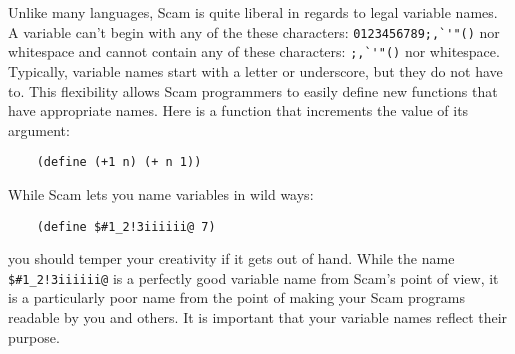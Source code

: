 Unlike many languages,
Scam is quite liberal in regards to legal variable names.
A variable can't begin with any of the these characters:
\verb!0123456789;,`'"()! nor whitespace and cannot contain any of these
characters: \verb!;,`'"()! nor whitespace. Typically,
variable names start with a letter or underscore, but
they do not have to. This flexibility allows Scam programmers
to easily define new functions that have appropriate names.
Here is a function that increments the value of its argument:

\begin{verbatim}
    (define (+1 n) (+ n 1))
\end{verbatim}

While Scam lets you name variables in wild ways:

\begin{verbatim}
    (define $#1_2!3iiiiii@ 7)
\end{verbatim}

you should temper your
creativity if it gets out of hand.
While the name \verb-$#1_2!3iiiiii@-
is a perfectly good variable name from Scam's point of
view,
it is a particularly poor name from the point of making your Scam
programs readable by you and others.
It is important that your variable
names reflect their purpose.


